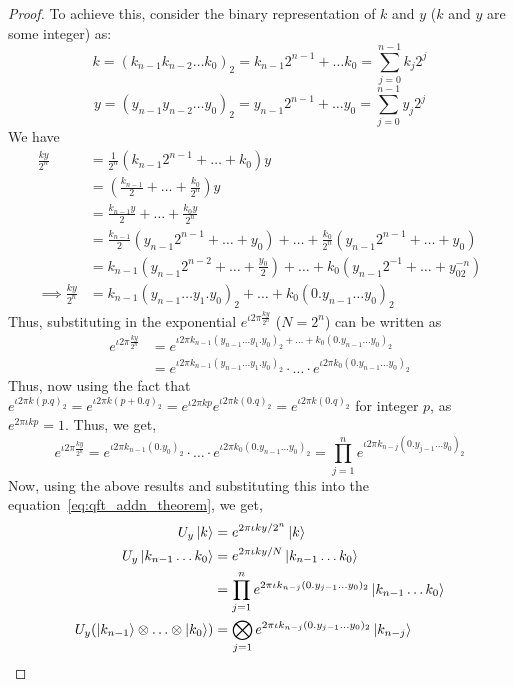 \begin{proof}
To achieve this, consider the binary representation of $k$ and $y$ ($k$ and $y$ are some integer) as:
\[
k = (k_{n-1} k_{n-2} \ldots k_0)_2 = k_{n-1}2^{n-1}+\ldots k_0 = \sum_{j=0}^{n-1} k_{j}2^{j}
\]
\[
y = (y_{n-1} y_{n-2} \ldots y_0)_2 = y_{n-1}2^{n-1}+\ldots y_0 = \sum_{j=0}^{n-1} y_{j}2^{j}
\]
We have
\begin{align*}
\frac{ky}{2^n}&=\frac{1}{2^n}(k_{n-1}2^{n-1}+\ldots+k_0)y\\
&=\left(\frac{k_{n-1}}{2}+\ldots+\frac{k_0}{2^n}\right)y\\
&=\frac{k_{n-1}y}{2}+\ldots+\frac{k_0y}{2^n}\\
&=\frac{k_{n-1}}{2}\left(y_{n-1}2^{n-1}+\ldots +y_0\right)+\ldots + \frac{k_0}{2^n}\left(y_{n-1}2^{n-1}+\ldots +y_0\right)\\
&=k_{n-1}(y_{n-1}2^{n-2}+\ldots+\frac{y_0}{2})+\ldots +k_0(y_{n-1}2^{-1}+\ldots+y_02^{-n})\\
\implies\frac{ky}{2^n}&=k_{n-1}(y_{n-1}\ldots y_1.y_0)_2+\ldots +k_0(0.y_{n-1}\ldots y_0)_2
\end{align*}
Thus, substituting in the exponential $e^{\iota 2\pi \frac{ky}{2^n}}$ ($N=2^n$) can be written as
\begin{align*}
    e^{\iota 2\pi \frac{ky}{2^n}}&=e^{\iota 2\pi k_{n-1}(y_{n-1}\ldots y_1.y_0)_2+\ldots +k_0(0.y_{n-1}\ldots y_0)_2}\\
    &=e^{\iota 2\pi k_{n-1}(y_{n-1}\ldots y_1.y_0)_2}\cdot \ldots \cdot e^{\iota 2\pi k_0(0.y_{n-1}\ldots y_0)_2}
\end{align*}
Thus, now using the fact that $e^{\iota 2\pi k(p.q)_2}=e^{\iota 2 \pi k (p+0.q)_2}=e^{\iota 2 \pi kp}e^{\iota 2 \pi k(0.q)_2}=e^{\iota 2 \pi k (0.q)_2}$ for integer $p$, as $e^{2\pi\iota kp}=1$. Thus, we get,
\[
e^{\iota 2\pi\frac{ky}{2^n}} =e^{\iota 2\pi k_{n-1}(0.y_0)_2}\cdot \ldots \cdot e^{\iota 2\pi k_0(0.y_{n-1}\ldots y_0)_2} = \prod_{j={1}}^{n} e^{\iota 2\pi k_{n-j}(0.y_{j-1}\ldots y_0)_2}
\]
Now, using the above results and substituting this into the equation~\eqref{eq:qft_addn_theorem}, we get,
\begin{align*}
U_y \ket{k} &=e^{2\pi\iota ky/2^n}\ket{k}\\
    U_y\ket{k_{n-1}\ldots k_0} &=e^{2\pi\iota ky/N}\ket{k_{n-1}\ldots k_0}\\
    &=\prod_{j=1}^n e^{2\pi\iota k_{n-j}(0.y_{j-1}\ldots y_0)_2}\ket{k_{n-1}\ldots k_0}\\
    U_y (\ket{k_{n-1}}\otimes \ldots \otimes \ket{k_0})&=\bigotimes_{j=1}e^{2\pi\iota k_{n-j}(0.y_{j-1}\ldots y_0)_2}\ket{k_{n-j}}
\end{align*}

\end{proof}
